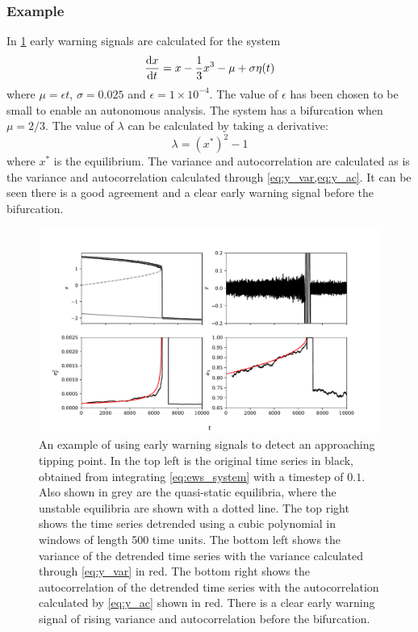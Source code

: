\subsubsection{Example}
In \cref{fig:ews} early warning signals are calculated for the system
\begin{equation}
  \label{eq:ews_system}
  \dv{x}{t} = x - \frac{1}{3}x^3 - \mu + \sigma \eta(t)
\end{equation}
where $\mu = \epsilon t$, $\sigma = 0.025$ and $\epsilon = 1\times 10^{-4}$. The value of $\epsilon$ has been chosen to be small to enable an autonomous analysis. The system has a bifurcation when $\mu = 2/3$.
The value of $\lambda$ can be calculated by taking a derivative:
\begin{equation}
  \label{eq:ews_lambda}
  \lambda = \left(x^*\right)^2 - 1 
\end{equation}
where $x^*$ is the equilibrium. The variance and autocorrelation are calculated as is the variance and autocorrelation calculated through \cref{eq:y_var,eq:y_ac}. It can be seen there is a
good agreement and a clear early warning signal before the bifurcation.
\begin{figure}
  \centering
  \includegraphics[width=\textwidth,keepaspectratio]{ews}
  \caption[An example of an early warning signal]{An example of using early warning signals to detect an approaching tipping point. In the top left is the original time series in black, obtained
    from integrating \cref{eq:ews_system} with a timestep of $0.1$. Also shown in grey are the quasi-static equilibria, where the unstable equilibria are shown with a dotted line.
    The top right shows the time series detrended using a cubic polynomial in windows of length 500 time units.
    The bottom left shows the variance of the detrended time series with the variance calculated through \cref{eq:y_var} in red. The bottom right shows the autocorrelation of the detrended time series
    with the autocorrelation calculated by \cref{eq:y_ac} shown in red. There is a clear early warning signal of rising variance and autocorrelation before the bifurcation.}
  \label{fig:ews}
\end{figure}

